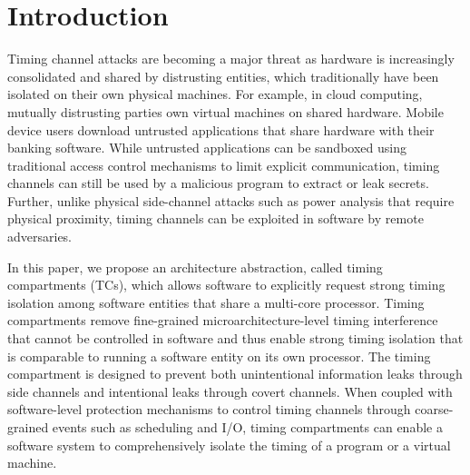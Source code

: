 \section{Introduction}

Timing channel attacks are becoming a major threat as hardware is increasingly 
consolidated and shared by distrusting entities, which traditionally have been
isolated on their own physical machines. For example, in cloud computing, mutually distrusting 
parties own virtual machines on shared hardware.
Mobile device users download untrusted applications that share hardware with 
their banking software.
While untrusted applications can be sandboxed using
traditional access control mechanisms to limit explicit communication,
timing 
channels can still be used by a malicious program to extract or leak secrets.
Further, unlike physical side-channel attacks such as power analysis that require
physical proximity, timing channels can be exploited in software by remote
adversaries.



In this paper, we propose an architecture abstraction, called timing compartments (TCs),
which allows software to explicitly request strong timing isolation among software
entities that share a multi-core processor.
Timing compartments remove fine-grained microarchitecture-level timing interference
that cannot be controlled in software and thus enable strong timing isolation that is
comparable to running a software entity on its own processor.
The timing compartment is designed to prevent both unintentional information leaks
through side channels and intentional leaks through covert channels.
When coupled with software-level protection mechanisms to control timing channels 
through coarse-grained events such as scheduling and I/O, timing compartments
can enable a software system to comprehensively isolate the timing of a program
or a virtual machine.

